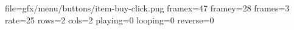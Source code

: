 file=gfx/menu/buttons/item-buy-click.png
framex=47
framey=28
frames=3
rate=25
rows=2
cols=2
playing=0
looping=0
reverse=0